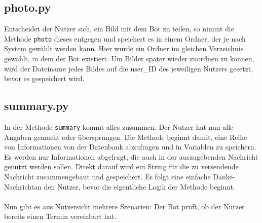         

        \subsection{photo.py} \label{photo.py}
                Entscheidet der Nutzer sich, ein Bild mit dem Bot zu teilen, so nimmt die Methode \verb|photo| dieses entgegen und speichert es in einem Ordner, der je nach System gewählt werden kann. Hier wurde ein Ordner im gleichen Verzeichnis gewählt, in dem der Bot existiert. Um Bilder später wieder zuordnen zu können, wird der Dateiname jedes Bildes auf die user\_ID des jeweiligen Nutzers gesetzt, bevor es gespeichert wird.

        

        \subsection{summary.py} \label{summary.py}
                In der Methode \verb|summary| kommt alles zusammen. Der Nutzer hat nun alle Angaben gemacht oder übersprungen. Die Methode beginnt damit, eine Reihe von Informationen von der Datenbank abzufragen und in Variablen zu speichern. Es werden nur Informationen abgefragt, die auch in der auszugebenden Nachricht genutzt werden sollen. Direkt darauf wird ein String für die zu versendende Nachricht zusammengebaut und gespeichert. Es folgt eine einfache \glqq Danke-Nachricht\grqq an den Nutzer, bevor die eigentliche Logik der Methode beginnt.\\
                \\
                Nun gibt es aus Nutzersicht mehrere Szenarien: Der Bot prüft, ob der Nutzer bereits einen Termin vereinbart hat.
                
